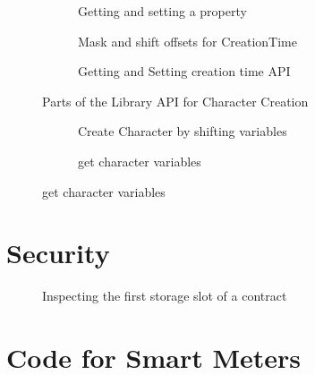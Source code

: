 \begin{appendices}
\begin{figure}[H]
  \begin{subfigure}[b]{\textwidth}
    \centering
    
    \caption{Getting and setting a property}
  \end{subfigure}
  \begin{subfigure}[b]{\textwidth}
    \centering
    
    \caption{Mask and shift offsets for CreationTime}
  \end{subfigure}
  \begin{subfigure}[b]{\textwidth}
    \centering
    
    \caption{Getting and Setting creation time API}
  \end{subfigure}
  \caption{Parts of the Library API for Character Creation}
  \label{apx:scalability:lib}
\end{figure}

\begin{figure}[H]
    \begin{subfigure}[b]{0.5\textwidth}
        \centering
        
        \caption{Create Character by shifting variables}
        \label{fig:bytes_encoding_code}
    \end{subfigure}
    \begin{subfigure}[b]{0.5\textwidth}
        \centering
        
        \caption{get character variables}
        \label{fig:bytes_decoding_code}
    \end{subfigure}
\end{figure}

\chapter{Security}
\begin{figure}[H]
    \centering
    
    \caption{Inspecting the first storage slot of a contract}
    \label{fig:storage}
\end{figure}
\chapter{Code for Smart Meters}

\end{appendices}